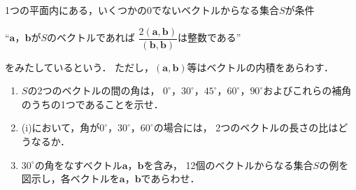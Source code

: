 \documentclass[../../main.tex]{subfiles}
\begin{document}
1つの平面内にある，いくつかの0でないベクトルからなる集合$S$が条件
\begin{center}
  “$\mathbf{a}$，$\mathbf{b}$が$S$のベクトルであれば
  $\displaystyle\dfrac{2(\mathbf{a},\mathbf{b})}{(\mathbf{b},\mathbf{b})}$は整数である”
\end{center}
をみたしているという．
ただし，$(\mathbf{a},\mathbf{b})$等はベクトルの内積をあらわす．
\begin{enumerate}
  \item[(i)] $S$の2つのベクトルの間の角は，
    $0^\circ$，${30}^\circ$，${45}^\circ$，${60}^\circ$，${90}^\circ$およびこれらの補角のうちの1つであることを示せ．
  \item[(ii)] (i)において，角が$0^\circ$，${30}^\circ$，${60}^\circ$の場合には，
    2つのベクトルの長さの比はどうなるか．
  \item[(iii)] ${30}^\circ$の角をなすベクトル$\mathbf{a}$，$\mathbf{b}$を含み，
    12個のベクトルからなる集合$S$の例を図示し，各ベクトルを$\mathbf{a}$，$\mathbf{b}$であらわせ．
\end{enumerate}
\end{document}
